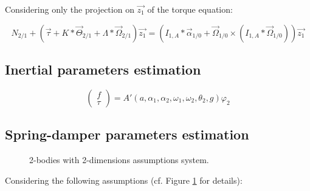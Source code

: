 \documentclass[\main/main.tex]{subfiles}
\begin{document}
Considering only the projection on $\overrightarrow{z_1}$ of the torque equation:

\begin{equation}
  N_{2/1} + (\overrightarrow{\tau} + K \ast \overrightarrow{\Theta}_{2/1} + \Lambda \ast \overrightarrow{\Omega}_{2/1}) \overrightarrow{z_1} = (I_{1, A} \ast \overrightarrow{\alpha}_{1/0} + \overrightarrow{\Omega}_{1/0} \times (I_{1, A} \ast \overrightarrow{\Omega}_{1/0})) \overrightarrow{z_1}
\end{equation}

\subsection{Inertial parameters estimation}
\label{appendix:msd:inertia_estimation}

\begin{equation}
  \label{background:eq:rmsd_inertia_estimation}
\begin{pmatrix}
  f \\ \tau
\end{pmatrix} = A'(a, \alpha_1, \alpha_2, \omega_1, \omega_2, \theta_2, g) \varphi_2
\end{equation}

\subsection{Spring-damper parameters estimation}

\begin{figure}[H]
\centering
   \caption{2-bodies with 2-dimensions assumptions system.}
   \label{fig:tikz:2_bodies}
\end{figure}

Considering the following assumptions (cf. Figure \ref{fig:tikz:2_bodies} for details):
\end{document}
